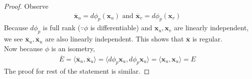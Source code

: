 \documentclass{report}
\begin{document}
\begin{proof}
Observe 
\begin{align*}
  \overline{\textbf{x}}_u=d\phi_p (\textbf{x}_u)\text{ and }\overline{\textbf{x}}_v=d\phi_p (\textbf{x}_v)
\end{align*}
Because $d\phi_p$ is full rank ($\because \phi$ is differentiable) and $\textbf{x}_u,\textbf{x}_v$ are linearly independent, we see $\overline{\textbf{x}}_u,\overline{\textbf{x}}_u$ are also linearly independent. This shows that $\overline{\textbf{x}}$ is regular.\\

Now because $\phi$ is an isometry, 
\begin{align*}
\overline{E}=\langle \overline{\textbf{x}}_u, \overline{\textbf{x}}_u \rangle = \langle d\phi_p \textbf{x}_u, d\phi_p \textbf{x}_u\rangle =\langle \textbf{x}_u, \textbf{x}_u\rangle =E
\end{align*}
The proof for rest of the statement is similar. 
\end{proof}
\end{document}

